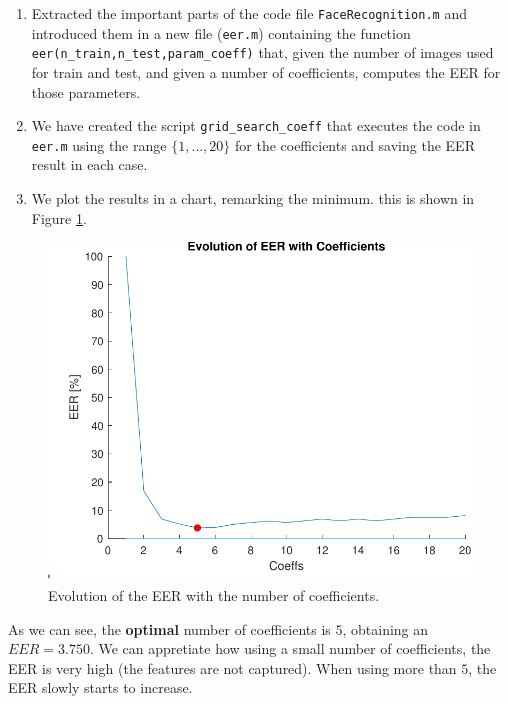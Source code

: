 \documentclass[a4paper]{article}
\def\inline{\lstinline[basicstyle=\ttfamily,keywordstyle={}]}
\begin{document}
\begin{enumerate}

\item Extracted the important parts of the code file \inline{FaceRecognition.m} and introduced them in a new file (\inline{eer.m}) containing the function \inline{eer(n_train,n_test,param_coeff)} that, given the number of images used for train and test, and given a number of coefficients, computes the EER for those parameters.
  
\item We have created the script \inline{grid_search_coeff} that executes the code in \inline{eer.m} using the range \(\{1,\dots,20\}\) for the coefficients and saving the EER result in each case.

\item We plot the results in a chart, remarking the minimum. this is shown in Figure \ref{fig:ex1c}.
\end{enumerate}

\begin{figure}[H]
  \centering
  \includegraphics[scale=0.5]{Figures/EERvsCOEFF}
    \caption{Evolution of the EER with the number of coefficients.}
    \label{fig:ex1c}
\end{figure}


As we can see, the \textbf{optimal} number of coefficients is \(5\), obtaining an \(EER = 3.750\). We can appretiate how using a small number of coefficients, the EER is very high (the features are not captured). When using more than \(5\), the EER slowly starts to increase.
\end{document}
